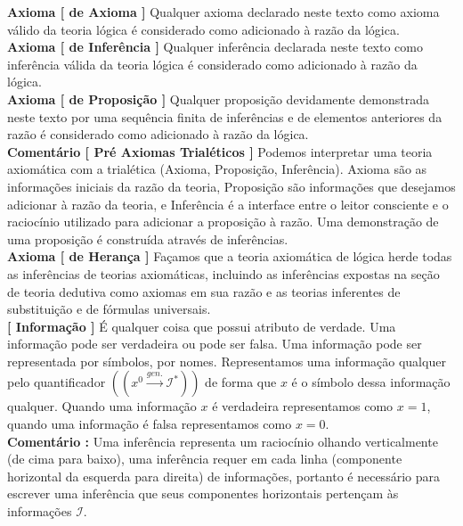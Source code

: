 \documentclass[10pt,a4paper]{report}
\begin{document}

\textbf{Axioma [ de Axioma ]} Qualquer axioma declarado neste texto como axioma válido da teoria lógica é considerado como adicionado à razão da lógica.\\

\textbf{Axioma [ de Inferência ]} Qualquer inferência declarada neste texto como inferência válida da teoria lógica é considerado como adicionado à razão da lógica.\\

\textbf{Axioma [ de Proposição ]} Qualquer proposição devidamente demonstrada neste texto por uma sequência finita de inferências e de elementos anteriores da razão é considerado como adicionado à razão da lógica.\\

\textbf{Comentário [ Pré Axiomas Trialéticos ]} Podemos interpretar uma teoria axiomática com a trialética (Axioma, Proposição, Inferência). Axioma são as informações iniciais da razão da teoria, Proposição são informações que desejamos adicionar à razão da teoria, e Inferência é a interface entre o leitor consciente e o raciocínio utilizado para adicionar a proposição à razão. Uma demonstração de uma proposição é construída através de inferências. \\

\textbf{Axioma [ de Herança ]} Façamos que a teoria axiomática de lógica herde todas as inferências de teorias axiomáticas, incluindo as inferências expostas na seção de teoria dedutiva como axiomas em sua razão e as teorias inferentes de substituição e de fórmulas universais.\\




\textbf{[ Informação ]} É qualquer coisa que possui atributo de verdade. Uma informação pode ser verdadeira ou pode ser falsa. Uma informação pode ser representada por símbolos, por nomes. Representamos uma informação qualquer pelo quantificador $ (( x^0 \overset{gen.}{\rightarrow} \mathcal{I}^* )) $ de forma que $x$ é o símbolo dessa informação qualquer. Quando uma informação $x$ é verdadeira representamos como $x=1$, quando uma informação é falsa representamos como $x=0$. \\

\textbf{Comentário :} Uma inferência representa um raciocínio olhando verticalmente (de cima para baixo), uma inferência requer em cada linha (componente horizontal da esquerda para direita) de informações, portanto é necessário para escrever uma inferência que seus componentes horizontais pertençam às informações $\mathcal{I}$.\\
\end{document}
